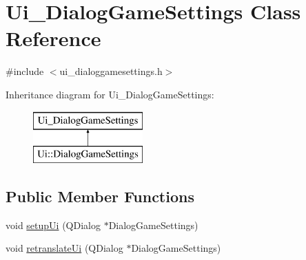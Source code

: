 \hypertarget{class_ui___dialog_game_settings}{\section{Ui\-\_\-\-Dialog\-Game\-Settings Class Reference}
\label{class_ui___dialog_game_settings}
}


{\ttfamily \#include $<$ui\-\_\-dialoggamesettings.\-h$>$}

Inheritance diagram for Ui\-\_\-\-Dialog\-Game\-Settings\-:\begin{figure}[H]
\begin{center}
\leavevmode
\includegraphics[height=2.000000cm]{class_ui___dialog_game_settings}
\end{center}
\end{figure}
\subsection*{Public Member Functions}
\begin{DoxyCompactItemize}
\item 
void \hyperlink{class_ui___dialog_game_settings_a454d2186fc33a40b3808cecd029cedf5}{setup\-Ui} (Q\-Dialog $\ast$Dialog\-Game\-Settings)
\item 
void \hyperlink{class_ui___dialog_game_settings_af278c61b6f1e7223bd6a9fe9bbd0b331}{retranslate\-Ui} (Q\-Dialog $\ast$Dialog\-Game\-Settings)
\end{DoxyCompactItemize}
